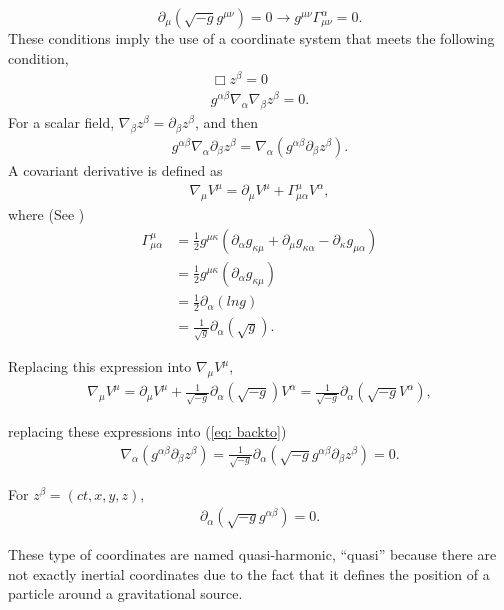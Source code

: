 \begin{equation}
\partial_\mu (\sqrt{-g}g^{\mu\nu})=0  \rightarrow g^{\mu\nu}\Gamma_{\mu\nu}^{\alpha}=0.
\end{equation}
These conditions imply the use of a coordinate system that meets the following condition,
\begin{align}
\Box z  ^\beta =0\\
g^{\alpha\beta} \nabla_\alpha\nabla_\beta z  ^\beta = 0.
\end{align}
For a scalar field, $\nabla_\beta z  ^\beta = \partial_\beta z  ^\beta$, and then
\begin{align}
\label{eq: backto}
g^{\alpha\beta} \nabla_\alpha \partial_\beta z  ^\beta = \nabla_\alpha (g^{\alpha\beta}\partial_\beta z  ^\beta).
\end{align}
A covariant derivative is defined as
\begin{align*}
\nabla_\mu V^\mu = \partial_\mu V^\mu + \Gamma^{\mu}_{\mu\alpha}V^\alpha, 
\end{align*}
where (See \cite{Weinberg})
\begin{align*}
\Gamma^{\mu}_{\mu\alpha} &= \frac{1}{2}g^{\mu\kappa}\left(\partial_\alpha g_{\kappa\mu}+\partial_\mu g_{\kappa\alpha}- \partial_\kappa g_{\mu\alpha}\right)\\
&=\frac{1}{2}g^{\mu\kappa}\left(\partial_\alpha g_{\kappa\mu}\right)\\
&=\frac{1}{2}\partial_\alpha(ln g)\\
&=\frac{1}{\sqrt{g}}\partial_\alpha(\sqrt{g}).
\end{align*}

Replacing this expression into $\nabla_\mu V^\mu$,
\begin{align*}
\nabla_\mu V^\mu = \partial_\mu V^\mu +\frac{1}{\sqrt{-g}}\partial_\alpha(\sqrt{-g})V^\alpha = \frac{1}{\sqrt{-g}}\partial_\alpha(\sqrt{-g}V^\alpha),
\end{align*}

replacing these expressions into (\ref{eq: backto})
\begin{align}
\nabla_\alpha (g^{\alpha\beta}\partial_\beta z  ^\beta) =  \frac{1}{\sqrt{-g}} \partial_\alpha(\sqrt{-g}g^{\alpha\beta}\partial_\beta z^\beta) = 0.
\end{align}

For $z  ^\beta = (ct,x,y,z)$,
\begin{align}
 \partial_\alpha(\sqrt{-g}g^{\alpha\beta}) = 0.
\end{align}

These type of coordinates are named quasi-harmonic, ``quasi'' because there are not exactly inertial coordinates due to the fact that it defines the position of a particle around a gravitational source.\\

